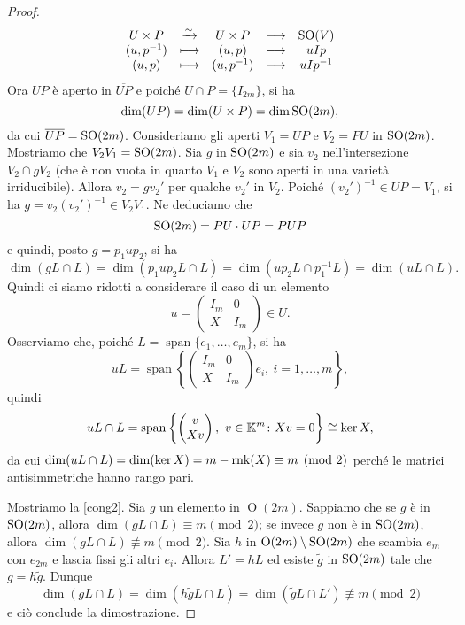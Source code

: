 \begin{proof}
\[\begin{array}{cccccc}
    U\times P & \xrightarrow{\sim} & U\times P &\longrightarrow & \operatorname{SO}(V) \\
     (u,p^{-1}) &\longmapsto& (u,p)&\longmapsto& u I p \\
     (u,p) &\longmapsto& (u,p^{-1})&\longmapsto& u I p^{-1}
\end{array}\]
Ora $UP$ è aperto in $\overline{UP}$ e poiché $U\cap P=\{I_{2m}\}$, si ha 
\[\dim(UP)=\dim (U \times P)= \dim \operatorname{SO}(2m),\] 
da cui $\overline{UP}=\operatorname{SO}(2m)$. Consideriamo gli aperti $V_1=UP$ e
$V_2=PU$ in $\operatorname{SO}(2m)$. Mostriamo che $V_2V_1=\operatorname{SO}(2m)$. %
Sia $g$ in $\operatorname{SO}(2m)$ e sia $v_2$ nell'intersezione $V_2\cap gV_2$ (che è non vuota in quanto $V_1$ e $V_2$ sono aperti in una varietà irriducibile). Allora $v_2=gv_2'$ per qualche $v_2'$ in $V_2$. Poiché $(v_2')^{-1}\in UP=V_1$, si ha $g=v_2(v_2')^{-1}\in V_2V_1$. Ne deduciamo che 
\[\operatorname{SO}(2m)= P U\cdot U P=PUP\] 
e quindi, posto $g=p_1 u p_2$, si ha 
\[\dim(gL\cap L)=\dim(p_1 u p_2L \cap L)=\dim(u p_2 L \cap p_1^{-1}L)=\dim(uL \cap L).\] 
Quindi ci siamo ridotti a considerare il caso di un elemento 
\[u=\begin{pmatrix}
    I_m & 0 \\ X & I_m
\end{pmatrix}\in U.\]
Osserviamo che, poiché $L=\operatorname{span}\{e_1,\ldots,e_m\}$, si ha 
\[uL=\operatorname{span}\left\{\begin{pmatrix}
    I_m & 0\\ X & I_m
\end{pmatrix} e_i,\  i=1,\ldots,m \right\}, %
\] 
quindi 
\[uL\cap L=\operatorname{span}\left\{\begin{pmatrix}
    v \\ Xv
\end{pmatrix}, \  v\in \mathbb{K}^m \colon  Xv=0\right\} \cong \ker X,\] 
da cui $\dim(uL\cap L)=\dim(\ker X)=m-\operatorname{rnk}(X) \equiv m \pmod{2}$ perché le matrici antisimmetriche hanno rango pari. 

Mostriamo la \eqref{cong2}. Sia $g$ un elemento in $\operatorname{O}(2m)$. Sappiamo che se $g$ è in $\operatorname{SO}(2m)$, allora $\dim(gL\cap L)\equiv m \pmod{2}$; se invece $g$ non è in $\operatorname{SO}(2m)$, allora $\dim(gL\cap L)\not\equiv m \pmod{2}$. Sia $h$ in $\operatorname{O}(2m)\setminus \operatorname{SO}(2m)$ che scambia $e_m$ con $e_{2m}$ e lascia fissi gli altri $e_i$. Allora $L'=hL$  %
ed esiste $\widetilde{g}$ in $\operatorname{SO}(2m)$ tale che $g=h\widetilde{g}$. Dunque \[\dim(gL\cap L)=\dim(h\widetilde{g}L\cap L)=\dim(\widetilde{g}L \cap L')\not\equiv m \pmod{2}\] e ciò conclude la dimostrazione. 
\end{proof}

